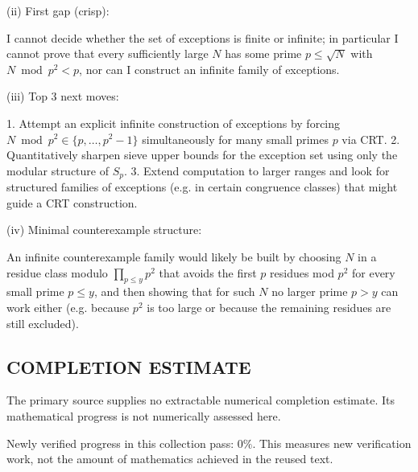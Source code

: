 (ii) First gap (crisp):

I cannot decide whether the set of exceptions is finite or infinite; in particular I cannot prove that every sufficiently large $N$ has some prime $p\le\sqrt N$ with $N\bmod p^2<p$, nor can I construct an infinite family of exceptions.

(iii) Top 3 next moves:

1. Attempt an explicit infinite construction of exceptions by forcing $N\bmod p^2\in\{p,\dots,p^2-1\}$ simultaneously for many small primes $p$ via CRT.
2. Quantitatively sharpen sieve upper bounds for the exception set using only the modular structure of $S_p$.
3. Extend computation to larger ranges and look for structured families of exceptions (e.g. in certain congruence classes) that might guide a CRT construction.

(iv) Minimal counterexample structure:

An infinite counterexample family would likely be built by choosing $N$ in a residue class modulo $\prod_{p\le y} p^2$ that avoids the first $p$ residues mod $p^2$ for every small prime $p\le y$, and then showing that for such $N$ no larger prime $p>y$ can work either (e.g. because $p^2$ is too large or because the remaining residues are still excluded).




\subsection*{COMPLETION ESTIMATE}
The primary source supplies no extractable numerical completion estimate. Its mathematical progress is not numerically assessed here.

Newly verified progress in this collection pass: $0\%$. This measures new verification work, not the amount of mathematics achieved in the reused text.

